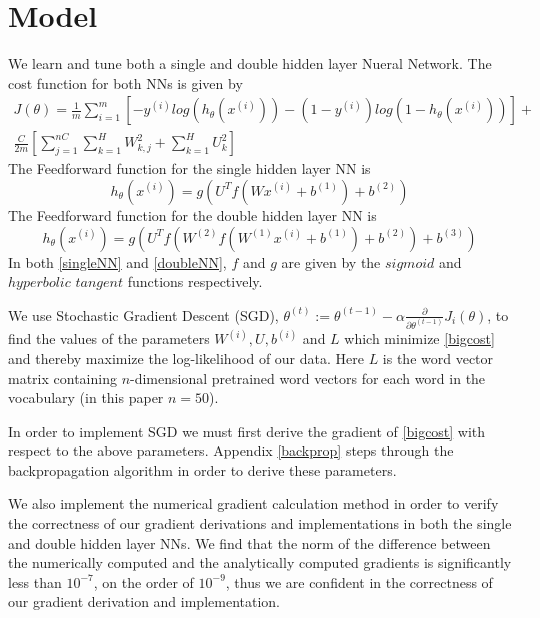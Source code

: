 \documentclass{article}
\begin{document}
\section{Model}\label{model}
We learn and tune both a single and double hidden layer Nueral Network.  The cost function for both NNs is given by
\begin{equation}\label{bigcost}
\begin{split}
J(\theta) = \frac{1}{m} \sum_{i=1}^m \left[-y ^{(i)} log(h_{\theta}(x^{(i)}))-(1-y^{(i)})log(1-h_{\theta}(x^{(i)}))\right]+\\ \frac{C}{2m} \left[ \sum_{j=1}^{nC} \sum_{k=1}^H W_{k,j}^2 + \sum_{k=1}^H U_{k}^2\right]
\end{split}
\end{equation}
The Feedforward function for the single hidden layer NN is
\begin{equation}\label{singleNN}
h_{\theta}(x^{(i)}) = g\left(U^Tf\left(Wx^{(i)}+b^{(1)}\right)+b^{(2)}\right)
\end{equation}
The Feedforward function for the double hidden layer NN is
\begin{equation}\label{doubleNN}
h_{\theta}(x^{(i)}) = g\left(U^T f\left( W^{(2)}f\left(W^{(1)}x^{(i)}+b^{(1)}\right) +b^{(2)}\right)+b^{(3)}\right)
\end{equation}
In both \eqref{singleNN} and \eqref{doubleNN}, \(f\) and \(g\) are given by the \(sigmoid\) and \(hyperbolic\) \(tangent\) functions respectively.

We use Stochastic Gradient Descent (SGD), \(\theta^{(t)} := \theta^{(t-1)} - \alpha\frac{\partial}{\partial\theta^{(t-1)}}J_i(\theta)\), to find the values of the parameters \(W^{(i)}, U, b^{(i)}\) and \(L\) which minimize \eqref{bigcost} and thereby maximize the log-likelihood of our data.  Here \(L\) is the word vector matrix containing \(n\)-dimensional pretrained word vectors for each word in the vocabulary (in this paper \(n=50\)).

In order to implement SGD we must first derive the gradient of \eqref{bigcost} with respect to the above parameters.  Appendix \ref{backprop} steps through the backpropagation algorithm in order to derive these parameters.

We also implement the numerical gradient calculation method in order to verify the correctness of our gradient derivations and implementations in both the single and double hidden layer NNs.  We find that the norm of the difference between the numerically computed and the analytically computed gradients is significantly less than \(10^{-7}\), on the order of \(10^{-9}\), thus we are confident in the correctness of our gradient derivation and implementation.
\end{document}
